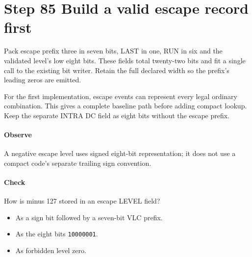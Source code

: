 \section{Step 85 Build a valid escape record first}\label{h263-coeff-s05}
Pack escape prefix three in seven bits, LAST in one, RUN in six and the validated
level's low eight bits. These fields total twenty-two bits and fit a single call
to the existing bit writer. Retain the full declared width so the prefix's leading
zeros are emitted.

For the first implementation, escape events can represent every legal ordinary
combination. This gives a complete baseline path before adding compact lookup.
Keep the separate INTRA DC field as eight bits without the escape prefix.

\paragraph{Observe} A negative escape level uses signed eight-bit representation;
it does not use a compact code's separate trailing sign convention.
\paragraph{Check} How is minus 127 stored in an escape LEVEL field?
\begin{itemize}
  \item[A.] As a sign bit followed by a seven-bit VLC prefix.
  \item[B.] As the eight bits \texttt{10000001}.
  \item[C.] As forbidden level zero.
\end{itemize}
